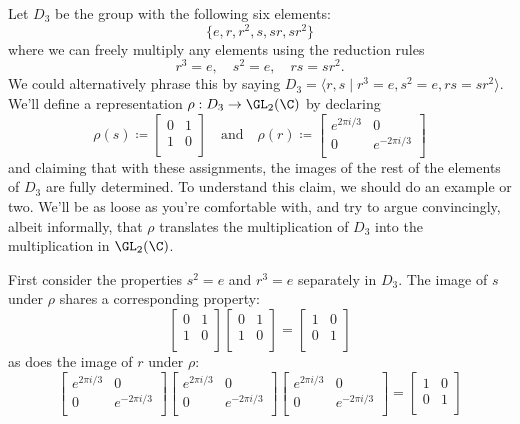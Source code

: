 Let $D_3$ be the group with the following six elements:
\[
    \{ e, r, r^2, s, sr, sr^2 \}
\]
where we can freely multiply any elements using the reduction rules
\[
    r^3 = e, \quad s^2 = e, \quad rs = sr^2.
\]
We could alternatively phrase this by saying $D_3 = \langle r,s \mid r^3 = e, s^2 = e, rs = sr^2 \rangle$.
We'll define a representation $\rho: D_3 \to \GL_2(\C)$ by declaring
\[
    \rho(s) \coloneq \begin{bmatrix}
        0 & 1 \\
        1 & 0 \\    
    \end{bmatrix}
    \quad \text{and} \quad
    \rho(r) \coloneq \begin{bmatrix}
        e^{2\pi i/3} & 0\\
        0 & e^{-2\pi i/3} \\
    \end{bmatrix}
\]
and claiming that with these assignments, the images of the rest of the elements of $D_3$ are fully determined.
To understand this claim, we should do an example or two.
We'll be as loose as you're comfortable with, and try to argue convincingly, albeit informally,
that $\rho$ translates the multiplication of $D_3$ into the multiplication in $\GL_2(\C)$.

First consider the properties $s^2=e$ and $r^3 = e$ separately in $D_3$.
The image of $s$ under $\rho$ shares a corresponding property:
\[
    \begin{bmatrix}
        0 & 1 \\
        1 & 0 \\    
    \end{bmatrix} \begin{bmatrix}
        0 & 1 \\
        1 & 0 \\    
    \end{bmatrix} = \begin{bmatrix}
        1 & 0 \\
        0 & 1 \\    
    \end{bmatrix}
\]
as does the image of $r$ under $\rho$:
\[
    \begin{bmatrix}
        e^{2\pi i/3} & 0\\
        0 & e^{-2\pi i/3} \\
    \end{bmatrix} \begin{bmatrix}
        e^{2\pi i/3} & 0\\
        0 & e^{-2\pi i/3} \\
    \end{bmatrix} \begin{bmatrix}
        e^{2\pi i/3} & 0\\
        0 & e^{-2\pi i/3} \\
    \end{bmatrix} = \begin{bmatrix}
        1 & 0 \\
        0 & 1 \\    
    \end{bmatrix}
\]